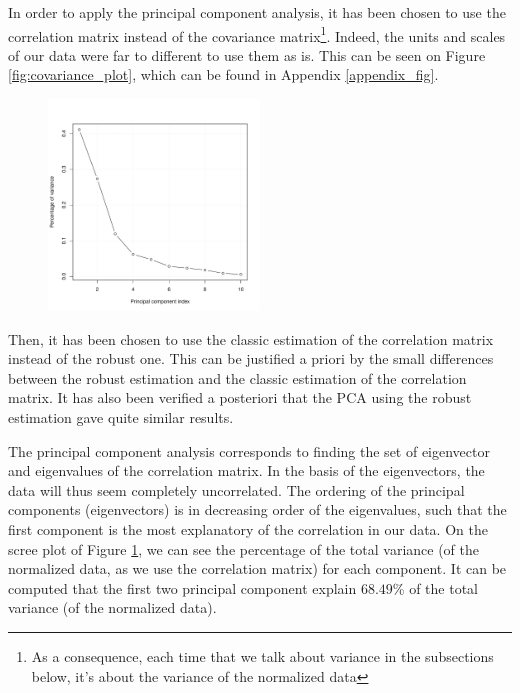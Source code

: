 \documentclass[a4paper, 12pt]{article}
\begin{document}
    In order to apply the principal component analysis, it has been chosen to use the correlation matrix instead of the covariance matrix\footnote{As a consequence, each time that we talk about variance in the subsections below, it's about the variance of the normalized data}. Indeed, the units and scales of our data were far to different to use them as is. This can be seen on Figure \ref{fig:covariance_plot}, which can be found in Appendix \ref{appendix_fig}.
    
    \begin{figure}
	    \vspace{-1.5em}
	    \centering
	    \includegraphics[width=0.5\textwidth]{resources/pdf/pca_scree_plot.pdf}
	    \label{fig:pca_scree_plot}
	    \vspace{-1em}
	\end{figure}

    Then, it has been chosen to use the classic estimation of the correlation matrix instead of the robust one. This can be justified a priori by the small differences between the robust estimation and the classic estimation of the correlation matrix. It has also been verified a posteriori that the PCA using the robust estimation gave quite similar results.

    The principal component analysis corresponds to finding the set of eigenvector and eigenvalues of the correlation matrix. In the basis of the eigenvectors, the data will thus seem completely uncorrelated. The ordering of the principal components (eigenvectors) is in decreasing order of the eigenvalues, such that the first component is the most explanatory of the correlation in our data. On the scree plot of Figure \ref{fig:pca_scree_plot}, we can see the percentage of the total variance (of the normalized data, as we use the correlation matrix) for each component. It can be computed that the first two principal component explain $68.49$\% of the total variance (of the normalized data).
\end{document}

